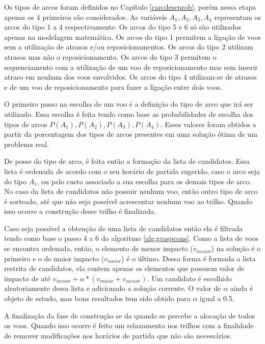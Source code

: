  Os tipos de arcos foram definidos no Capítulo \ref{cap:descprob}, porém nessa etapa apenas os 4 primeiros são considerados. As variáveis  $A_{1}, A_{2}, A_{3}, A_{4}$ representam os arcos do tipo 1 a 4 respectivamente. Os arcos do tipo 5 e 6 só são utilizados apenas na modelagem matemática. Os arcos do tipo 1 permitem a ligação de voos sem a utilização de atrasos e/ou reposicionamentos. Os arcos do tipo 2 utilizam atrasos mas não o reposicionamento. Os arcos do tipo 3 permitem o sequenciamento com a utilização de um voo de reposicionamento mas sem inserir atraso em nenhum dos voos envolvidos. Os arcos do tipo 4 utilizam-se de atrasos e de um voo de reposicionamento para fazer a ligação entre dois voos.
 
 O primeiro passo na escolha de um voo é a definição do tipo de arco que irá ser utilizado. Essa escolha é feita tendo como base as probabilidades de escolha dos tipos de arcos $P(A_{1}), P(A_{2}), P(A_{3}), P(A_{4})$. Esses valores foram obtidos a partir da porcentagem dos tipos de arcos presentes em uma solução ótima de um problema real.
 
 De posse do tipo de arco, é feita então a formação da lista de candidatos. Essa lista é ordenada de acordo com o seu horário de partida sugerido, caso o arco seja do tipo $A_{1}$, ou pelo custo associado a sua escolha para os demais tipos de arco. No caso da lista de candidatos não possuir nenhum voo, então outro tipo de arco é sorteado, até que não seja possível acrescentar nenhum voo ao trilho. Quando isso ocorre a construção desse trilho é finalizada.
 
 Caso seja possível a obtenção de uma lista de candidatos então ela é filtrada tendo como base o passo 4 a 6 do algoritmo \ref{alg:graspcons}. Como a lista de voos se encontra ordenada, então, o elemento de menor impacto ($v_{menor}$) na solução é o primeiro e o de maior impacto ($v_{maior}$) é o último. Dessa forma é formada a lista restrita de candidatos, ela contem apenas os elementos que possuem valor de impacto de até $v_{menor} + \alpha*(v_{maior} + v_{menor})$. Um candidato é escolhido aleatoriamente dessa lista e adicionado a solução corrente. O valor de $\alpha$ ainda é objeto de estudo, mas bons resultados tem sido obtido para $\alpha$ igual a 0.5.
 
 A finalização da fase de construção se da quando se percebe a alocação de todos os voos. Quando isso ocorre é feito um relaxamento nos trilhos com a finalidade de remover modificações nos horários de partida que não são necessários. 
 
